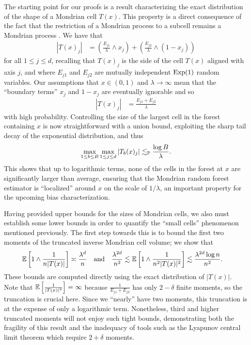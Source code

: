 The starting point for our proofs is a result characterizing the exact
distribution of the shape of a Mondrian cell $T(x)$. This property is a direct
consequence of the fact that the restriction of a Mondrian process to a subcell
remains a Mondrian process \citep{mourtada2020minimax}. We have that
%
\begin{align*}
  |T(x)_j|
  &= \left( \frac{E_{j1}}{\lambda} \wedge x_j \right)
  + \left( \frac{E_{j2}}{\lambda} \wedge (1-x_j) \right)
\end{align*}
%
for all $1 \leq j \leq d$, recalling that $T(x)_j$ is the side of the cell
$T(x)$ aligned with axis $j$, and where $E_{j1}$ and $E_{j2}$ are mutually
independent $\Exp(1)$ random variables. Our assumptions that $x \in (0,1)$ and
$\lambda \to \infty$ mean that the ``boundary terms'' $x_j$ and $1-x_j$ are
eventually ignorable and so
%
\begin{align*}
  |T(x)_j| &= \frac{E_{j1} + E_{j2}}{\lambda}
\end{align*}
%
with high probability. Controlling the size of the largest cell in the forest
containing $x$ is now straightforward with a union bound, exploiting the sharp
tail decay of the exponential distribution, and thus
%
\begin{align*}
  \max_{1 \leq b \leq B} \max_{1 \leq j \leq d} |T_b(x)_j|
  \lesssim_\P \frac{\log B}{\lambda}.
\end{align*}
%
This shows that up to logarithmic terms, none of the cells in the forest at $x$
are significantly larger than average, ensuring that the Mondrian random forest
estimator is ``localized'' around $x$ on the scale of $1/\lambda$, an important
property for the upcoming bias characterization.

Having provided upper bounds for the sizes of Mondrian cells, we also must
establish some lower bounds in order to quantify the ``small cells'' phenomenon
mentioned previously. The first step towards this is to bound the first two
moments of the truncated inverse Mondrian cell volume; we show that
%
\begin{align*}
  \E\left[ 1 \wedge \frac{1}{n |T(x)|} \right]
  &\asymp \frac{\lambda^d}{n}
  &&\text{and}
  &\frac{\lambda^{2d}}{n^2}
  &\lesssim
  \E\left[ 1 \wedge \frac{1}{n^2 |T(x)|^2} \right]
  \lesssim \frac{\lambda^{2d} \log n}{n^2}.
\end{align*}
%
These bounds are computed directly using the exact distribution of $|T(x)|$.
Note that $\E\left[ \frac{1}{|T(x)|^2} \right] = \infty$ because
$\frac{1}{E_{j1} + E_{j2}}$ has only $2 - \delta$ finite moments, so the
truncation is crucial here. Since we ``nearly'' have two moments, this
truncation is at the expense of only a logarithmic term. Nonetheless, third and
higher truncated moments will not enjoy such tight bounds, demonstrating both
the fragility of this result and the inadequacy of tools such as the Lyapunov
central limit theorem which require $2 + \delta$ moments.

